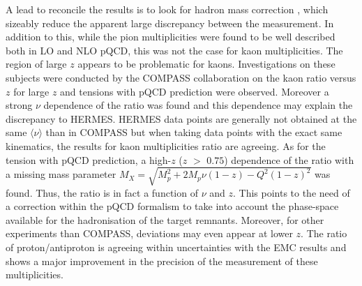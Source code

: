 A lead to reconcile the results is to look for hadron mass correction \cite{Accardi}, which sizeably reduce the apparent large discrepancy between the measurement. In addition to this, while the pion multiplicities were found to be well described both in LO and NLO pQCD, this was not the case for kaon multiplicities. The region of large $z$ appears to be problematic for kaons. Investigations on these subjects were conducted by the COMPASS collaboration on the kaon ratio versus $z$ for large $z$ \cite{MarcinPubli} and tensions with pQCD prediction were observed. Moreover a strong $\nu$ dependence of the ratio was found and this dependence may explain the discrepancy to HERMES. HERMES data points are generally not obtained at the same $\langle \nu \rangle$ than in COMPASS but when taking data points with the exact same kinematics, the results for kaon multiplicities ratio are agreeing. As for the tension with pQCD prediction, a high-$z$ ($z$ $>$ $0.75$) dependence of the ratio with a missing mass parameter $M_X = \sqrt{M^2_p + 2M_p \nu (1-z) - Q^2 (1-z)^2}$ was found. Thus, the ratio is in fact a function of $\nu$ and $z$. This points to the need of a correction within the pQCD formalism to take into account the phase-space available for the hadronisation of the target remnants. Moreover, for other experiments than COMPASS, deviations may even appear at lower $z$. The ratio of proton/antiproton is agreeing within uncertainties with the EMC results and shows a major improvement in the precision of the measurement of these multiplicities.

\newpage

